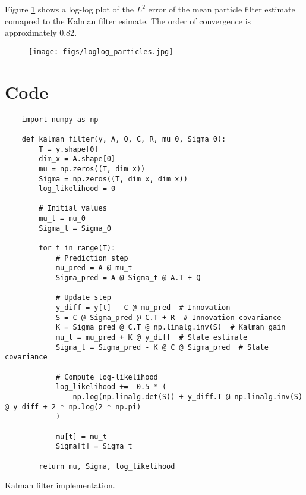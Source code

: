 \documentclass[12pt]{article}
\begin{document}
Figure \ref{fig:loglog_particles} shows a log-log plot of the $L^2$ error of the mean particle filter estimate comapred to the Kalman filter esimate. 
The order of convergence is approximately $0.82$.


\begin{figure}[H]
    \centering
    \texttt{[image: figs/loglog\_particles.jpg]}
    \label{fig:loglog_particles}
\end{figure}

\newpage
\printbibliography

\newpage
\appendix

\section{Code}

\begin{listing}[H]
\begin{verbatim}
    import numpy as np
    
    def kalman_filter(y, A, Q, C, R, mu_0, Sigma_0):
        T = y.shape[0]
        dim_x = A.shape[0]
        mu = np.zeros((T, dim_x))
        Sigma = np.zeros((T, dim_x, dim_x))
        log_likelihood = 0
    
        # Initial values
        mu_t = mu_0
        Sigma_t = Sigma_0
    
        for t in range(T):
            # Prediction step
            mu_pred = A @ mu_t
            Sigma_pred = A @ Sigma_t @ A.T + Q
    
            # Update step
            y_diff = y[t] - C @ mu_pred  # Innovation
            S = C @ Sigma_pred @ C.T + R  # Innovation covariance
            K = Sigma_pred @ C.T @ np.linalg.inv(S)  # Kalman gain
            mu_t = mu_pred + K @ y_diff  # State estimate
            Sigma_t = Sigma_pred - K @ C @ Sigma_pred  # State covariance
    
            # Compute log-likelihood
            log_likelihood += -0.5 * (
                np.log(np.linalg.det(S)) + y_diff.T @ np.linalg.inv(S) @ y_diff + 2 * np.log(2 * np.pi)
            )
    
            mu[t] = mu_t
            Sigma[t] = Sigma_t
    
        return mu, Sigma, log_likelihood
\end{verbatim}
\caption{Kalman filter implementation.}
\label{lst:kalman_filter}
\end{listing}
\end{document}
